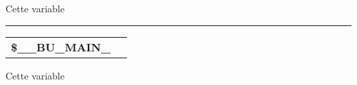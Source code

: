 \documentclass[a4paper,10pt]{article}
\begin{document}
\begin{justify}
    Cette variable
\end{justify}


\par\noindent\rule{\textwidth}{0.4pt}

\begin{justify}
    \begin{tabular}{l|l}
        \textbf{\color{vars}\$\_\_BU\_MAIN\_}   & \\[1\baselineskip]
    \end{tabular}
\end{justify}

\begin{justify}
    Cette variable
\end{justify}
\end{document}
